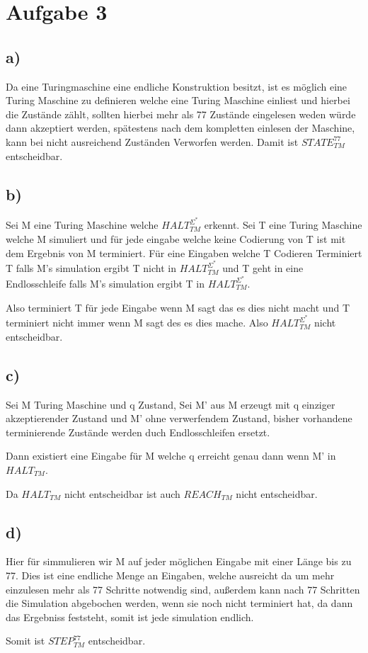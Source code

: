 \section*{Aufgabe 3}

\subsection*{a)}
Da eine Turingmaschine eine endliche Konstruktion besitzt,
ist es möglich eine Turing Maschine zu definieren welche eine Turing Maschine einliest und hierbei die Zustände zählt,
sollten hierbei mehr als 77 Zustände eingelesen weden würde dann akzeptiert werden,
spätestens nach dem kompletten einlesen der Maschine, kann bei nicht ausreichend Zuständen Verworfen werden.
Damit ist $STATE^{77}_{TM}$ entscheidbar.

\subsection*{b)}

Sei M eine Turing Maschine welche $HALT_{TM}^{\Sigma^{*}}$ erkennt. 
Sei T eine Turing Maschine welche M simuliert und für jede eingabe welche keine Codierung von T ist mit dem Ergebnis von M terminiert.
Für eine Eingaben welche T Codieren Terminiert T falls M's simulation ergibt T nicht in $HALT_{TM}^{\Sigma^{*}}$ und T geht in eine Endlosschleife falls M's simulation ergibt T in $HALT_{TM}^{\Sigma^{*}}$.

Also terminiert T für jede Eingabe wenn M sagt das es dies nicht macht und T terminiert nicht immer wenn M sagt des es dies mache.
Also $HALT_{TM}^{\Sigma^{*}}$ nicht entscheidbar.

\subsection*{c)}

Sei M Turing Maschine und q Zustand,
Sei M' aus M erzeugt mit q einziger akzeptierender Zustand und M' ohne verwerfendem Zustand, bisher vorhandene terminierende Zustände werden duch Endlosschleifen ersetzt.

Dann existiert eine Eingabe für M welche q erreicht genau dann wenn M' in $HALT_{TM}$.

Da  $HALT_{TM}$ nicht entscheidbar ist auch $REACH_{TM}$
nicht entscheidbar.

\subsection*{d)}

Hier für simmulieren wir M auf jeder möglichen Eingabe mit einer Länge bis zu 77. Dies ist eine endliche Menge an Eingaben, welche ausreicht da um mehr einzulesen mehr als 77 Schritte notwendig sind, außerdem kann nach 77 Schritten die Simulation abgebochen werden, wenn sie noch nicht terminiert hat, da dann das Ergebniss feststeht, somit ist jede simulation endlich.

Somit ist $STEP_{TM}^{77}$ entscheidbar.